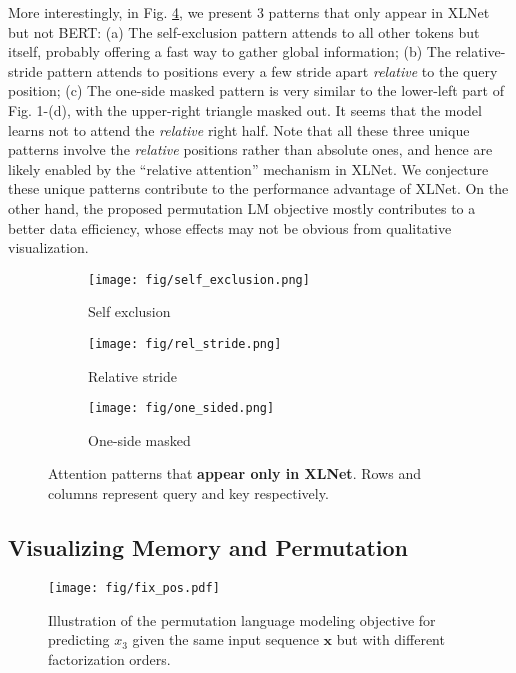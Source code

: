 \documentclass{article}
\def\rvx{{\mathbf{x}}}
\begin{document}
More interestingly, in Fig. \ref{fig:xlnet_unique}, we present 3 patterns that only appear in XLNet but not BERT:
(a) The self-exclusion pattern attends to all other tokens but itself, probably offering a fast way to gather global information; (b) The relative-stride pattern attends to positions every a few stride apart \textit{relative} to the query position; (c) The one-side masked pattern is very similar to the lower-left part of Fig. 1-(d), with the upper-right triangle masked out. It seems that the model learns not to attend the \textit{relative} right half. 
Note that all these three unique patterns involve the \textit{relative} positions rather than absolute ones, and hence are likely enabled by the ``relative attention'' mechanism in XLNet. 
We conjecture these unique patterns contribute to the performance advantage of XLNet.
On the other hand, the proposed permutation LM objective mostly contributes to a better data efficiency, whose effects may not be obvious from qualitative visualization.
\begin{figure}[!h]
  \vspace{-1em}
  \centering
  \begin{subfigure}[b]{0.22\textwidth}
    \centering
    \texttt{[image: fig/self\_exclusion.png]}
    \caption{\footnotesize Self exclusion}
    \label{fig:self_exclusion}
    \vspace{-0.3em}
  \end{subfigure}
  \hfill
  \begin{subfigure}[b]{0.22\textwidth}
    \centering
    \texttt{[image: fig/rel\_stride.png]}
    \caption{\footnotesize Relative stride}
    \label{fig:rel_stride}
    \vspace{-0.3em}
  \end{subfigure}
  \hfill
  \begin{subfigure}[b]{0.22\textwidth}
    \centering
    \texttt{[image: fig/one\_sided.png]}
    \caption{\footnotesize One-side masked}
    \label{fig:one_sided}
    \vspace{-0.3em}
  \end{subfigure}
  \caption{\footnotesize Attention patterns that \textbf{appear only in XLNet}. Rows and columns represent query and key respectively.}
  \label{fig:xlnet_unique}
  \vspace{-1.5em}
\end{figure}


\subsection{Visualizing Memory and Permutation}
\label{sec:vis}
\begin{figure}[!h]
	\centering
	\texttt{[image: fig/fix\_pos.pdf]}
	\caption{Illustration of the permutation language modeling objective for predicting $x_3$ given the same input sequence $\rvx$ but with different factorization orders.}
	\label{fig:obj_overview}
\end{figure}
\end{document}
